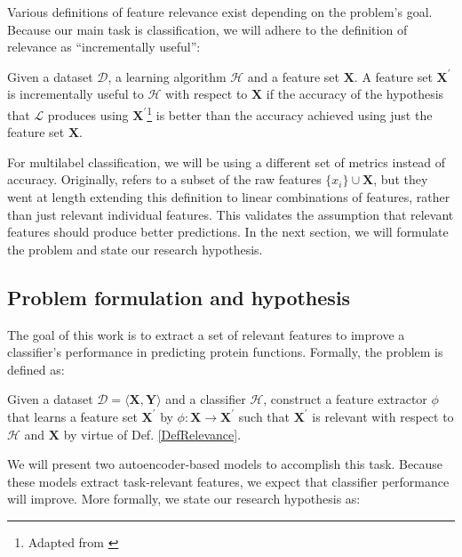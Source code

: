 \par Various definitions of feature relevance exist depending on the
problem's goal. Because our main task is classification, we will adhere to
the definition of relevance as ``incrementally useful'':

\begin{definition}
  \label{DefRelevance}
   Given a dataset $\mathcal{D}$, a learning algorithm $\mathcal{H}$ and a
   feature set $\mathbf{X}$. A feature set $\mathbf{X}^{\prime}$ is
   incrementally useful to $\mathcal{H}$ with respect to $\mathbf{X}$ if the
   accuracy of the hypothesis that $\mathcal{L}$ produces using
   $\mathbf{X}^{\prime}$\footnote{Adapted from \cite{blum1997selection}}
   is better than the accuracy achieved using just the
   feature set $\mathbf{X}$.
\end{definition}

\par\noindent For multilabel classification, we will be using a different set
of metrics instead of accuracy. Originally, \cite{blum1997selection} refers to
a subset of the raw features $\{x_{i}\} \cup \mathbf{X}$, but they went at
length extending this definition to linear combinations of features, rather
than just relevant individual features. This validates the assumption that
relevant features should produce better predictions. In the next section, we
will formulate the problem and state our research hypothesis.

\subsection{Problem formulation and hypothesis}

\par The goal of this work is to extract a set of relevant features to
improve a classifier's performance in predicting protein functions. Formally,
the problem is defined as:

\begin{definition}
  \label{DefProblem}
  Given a dataset $\mathcal{D}=\langle \mathbf{X}, \mathbf{Y} \rangle$ and a
  classifier $\mathcal{H}$, construct a feature extractor $\phi$ that learns
  a feature set $\mathbf{X}^{\prime}$ by $\phi: \mathbf{X} \rightarrow
  \mathbf{X}^{\prime}$ such that $\mathbf{X}^{\prime}$ is relevant with respect
  to $\mathcal{H}$ and $\mathbf{X}$ by virtue of Def. \ref{DefRelevance}.
\end{definition}

\par\noindent We will present two autoencoder-based models to accomplish this
task.  Because these models extract task-relevant features, we expect that
classifier performance will improve. More formally, we state our research
hypothesis as:

